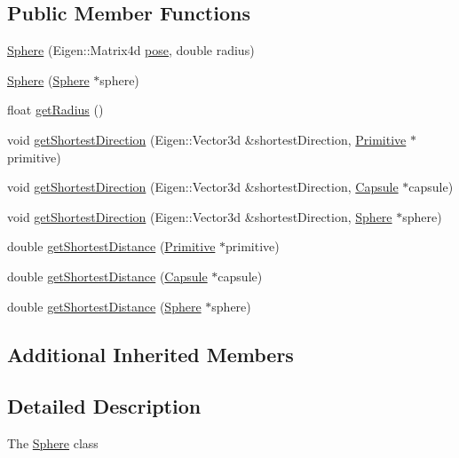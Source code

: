 \subsection*{Public Member Functions}
\begin{DoxyCompactItemize}
\item 
\hyperlink{class_sphere_a7a9a9cfc01f619bb8cda60ae907d6372}{Sphere} (Eigen\+::\+Matrix4d \hyperlink{class_primitive_ad8b2afbad412f6046783d155c88fe312}{pose}, double radius)
\item 
\hyperlink{class_sphere_a564eb09ed988535e33c2b2e701d80581}{Sphere} (\hyperlink{class_sphere}{Sphere} $\ast$sphere)
\item 
float \hyperlink{class_sphere_a330dd34c7c7b6dfff106c4c71ec80028}{get\+Radius} ()
\item 
void \hyperlink{class_sphere_a707fc14e03a6ff67ac012a18b2a8cb28}{get\+Shortest\+Direction} (Eigen\+::\+Vector3d \&shortest\+Direction, \hyperlink{class_primitive}{Primitive} $\ast$primitive)
\item 
void \hyperlink{class_sphere_af7ff30023363261cf118d1fb80c745a7}{get\+Shortest\+Direction} (Eigen\+::\+Vector3d \&shortest\+Direction, \hyperlink{class_capsule}{Capsule} $\ast$capsule)
\item 
void \hyperlink{class_sphere_a719592bc6a8307060f49f289da631310}{get\+Shortest\+Direction} (Eigen\+::\+Vector3d \&shortest\+Direction, \hyperlink{class_sphere}{Sphere} $\ast$sphere)
\item 
double \hyperlink{class_sphere_a7330816427e4099f4a8ccb8c34bd9ec6}{get\+Shortest\+Distance} (\hyperlink{class_primitive}{Primitive} $\ast$primitive)
\item 
double \hyperlink{class_sphere_a2b078585c4b272e9286eac12189b885b}{get\+Shortest\+Distance} (\hyperlink{class_capsule}{Capsule} $\ast$capsule)
\item 
double \hyperlink{class_sphere_a6efb9b513c9b42a7b040969b802727ea}{get\+Shortest\+Distance} (\hyperlink{class_sphere}{Sphere} $\ast$sphere)
\end{DoxyCompactItemize}
\subsection*{Additional Inherited Members}


\subsection{Detailed Description}
The \hyperlink{class_sphere}{Sphere} class

